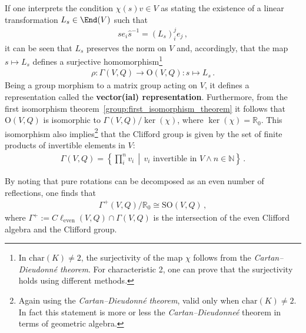     \begin{property}
        If one interprets the condition $\chi(s)v\in V$ as stating the existence of a linear transformation $L_s\in\End(V)$ such that
        \begin{gather}
            se_i\widehat{s}^{-1} = (L_s)^j_ie_j\,,
        \end{gather}
        it can be seen that $L_s$ preserves the norm on $V$ and, accordingly, that the map $s\mapsto L_s$ defines a surjective homomorphism\footnote{In $\mathrm{char}(K)\neq2$, the surjectivity of the map $\chi$ follows from the \textit{Cartan--Dieudonn\'e theorem}. For characteristic 2, one can prove that the surjectivity holds using different methods.}
        \begin{gather}
            \rho:\Gamma(V,Q)\rightarrow\mathrm{O}(V,Q):s\mapsto L_s\,.
        \end{gather}
        Being a group morphism to a matrix group acting on $V$, it defines a representation called the \textbf{vector(ial) representation}. Furthermore, from the first isomorphism theorem~\ref{group:first_isomorphism_theorem} it follows that $\mathrm{O}(V,Q)$ is isomorphic to $\Gamma(V,Q)/\ker(\chi)$, where $\ker(\chi)=\mathbb{R}_0$. This isomorphism also implies\footnote{Again using the \textit{Cartan--Dieudonn\'e theorem}, valid only when $\mathrm{char}(K)\neq2$. In fact this statement is more or less the \textit{Cartan--Dieudonne\'e} theorem in terms of geometric algebra.} that the Clifford group is given by the set of finite products of invertible elements in $V$:
        \begin{gather}
            \Gamma(V,Q) = \left\{\prod_i^nv_i\,\middle\vert\,v_i\text{ invertible in }V\land n\in\mathbb{N}\right\}\,.
        \end{gather}
    \end{property}
    \begin{result}
        By noting that pure rotations can be decomposed as an even number of reflections, one finds that
        \begin{gather}
            \Gamma^+(V,Q)/\mathbb{R}_0\cong\mathrm{SO}(V,Q)\,,
        \end{gather}
        where $\Gamma^+:=C\ell_{\text{even}}(V,Q)\cap\Gamma(V,Q)$ is the intersection of the even Clifford algebra and the Clifford group.
    \end{result}

